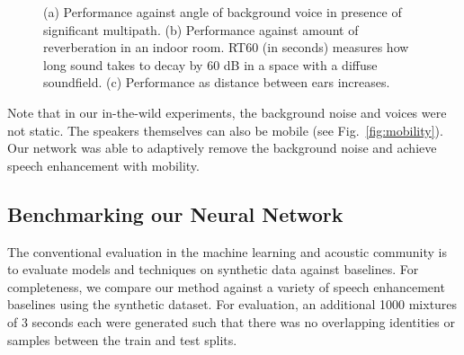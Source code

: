 \documentclass [11pt, proquest] {uwthesis}[2020/02/24]
\begin{document}
\begin{figure}
\centering  
\vskip -0.15in %
{}\hfill
{}\hfill
{}
\vskip -0.15in
\caption{(a) Performance against angle of background voice in presence of significant multipath.  (b) Performance against amount of reverberation in an indoor room. RT60 (in seconds) measures how long sound takes to decay by 60 dB in a space with a diffuse soundfield. (c) Performance as distance between ears increases.}
\label{fig:ml-performance}
\vskip -0.2in
\end{figure}


Note that in our in-the-wild experiments, the background noise and voices were not static. The speakers themselves can  also be  mobile (see Fig.~\ref{fig:mobility}). Our network was able to adaptively remove the background noise and achieve speech enhancement with  mobility. 


\subsection{Benchmarking our Neural Network}
The conventional evaluation in the machine learning and acoustic community is to evaluate models and techniques on synthetic data against baselines. For completeness, we compare our method against a variety of speech enhancement baselines using the synthetic dataset. For evaluation, an additional 1000 mixtures of 3 seconds each were generated such that there was no overlapping identities or samples between the train and test splits.
\end{document}
